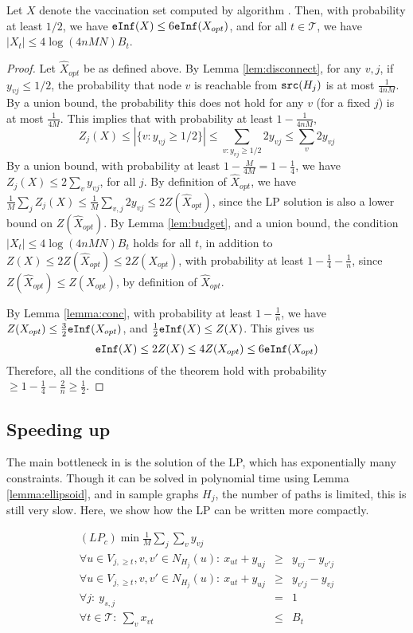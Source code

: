 \begin{theorem}
\label{theorem:algo}
Let $X$ denote the vaccination set computed by algorithm \algo{}.
Then, with probability at least $1/2$, we have
$\texttt{eInf}(X)\leq 6\texttt{eInf}(X_{opt})$, and for all $t\in\mathcal{T}$, we have
$|X_t|\leq 4\log(4nMN)B_t$.
\end{theorem}
\begin{proof}
Let $\hat{X}_{opt}$ be as defined above. 
By Lemma \ref{lem:disconnect}, for any $v, j$, if $y_{vj} \leq 1/2$, the probability that node $v$ is
reachable from $\texttt{src}(H_j)$ is at most $\frac{1}{4nM}$.
By a union bound, the probability this does not hold for any $v$ (for a fixed $j$) is at most $\frac{1}{4M}$.
This implies that with probability at least $1-\frac{1}{4nM}$, 
\[
Z_j(X)\leq |\{v: y_{vj}\geq 1/2\}|\leq \sum_{v: y_{vj}\geq 1/2} 2y_{vj} \leq \sum_v 2y_{vj}
\]
By a union bound, with probability at least $1-\frac{M}{4M}=1-\frac{1}{4}$,
we have $Z_j(X)\leq 2\sum_v y_{vj}$, for all $j$.
By definition of $\hat{X}_{opt}$, we have $\frac{1}{M}\sum_j Z_j(X)\leq \frac{1}{M}\sum_{v,j} 2y_{vj} \leq 2Z(\hat{X}_{opt})$,
since the LP solution is also a lower bound on $Z(\hat{X}_{opt})$.
By Lemma \ref{lem:budget}, and a union bound, the condition $|X_t|\leq 4\log(4nMN)B_t$ holds for all $t$,
in addition to $Z(X)\leq 2Z(\hat{X}_{opt})\leq 2Z(X_{opt})$, with probability at least $1-\frac{1}{4}-\frac{1}{n}$,
since $Z(\hat{X}_{opt})\leq Z(X_{opt})$, by definition of $\hat{X}_{opt}$.

By Lemma \ref{lemma:conc}, with probability at least $1-\frac{1}{n}$,
we have $Z(X_{opt})\leq \frac{3}{2}\texttt{eInf}(X_{opt})$, and
$\frac{1}{2}\texttt{eInf}(X)\leq Z(X)$. This gives us
\[
\texttt{eInf}(X)\leq 2Z(X)\leq 4Z(X_{opt})\leq 6\texttt{eInf}(X_{opt})
\]
Therefore, all the conditions of the theorem hold with probability $\geq 1-\frac{1}{4}-\frac{2}{n}\geq \frac{1}{2}$.
\end{proof}


\subsection{Speeding up \algo{}}

The main bottleneck in \algo{} is the solution of the LP, which has exponentially many constraints.
Though it can be solved in polynomial time using Lemma \ref{lemma:ellipsoid}, and in sample graphs $H_j$,
the number of paths is limited, this is still very slow.
Here, we show how the LP can be written more compactly.

\begin{eqnarray*}
(LP_c) \min \frac{1}{M}\sum_j \sum_v y_{vj} &&\\
\forall u\in V_{j,\geq t}, v, v'\in N_{H_j}(u):\ x_{ut} + y_{uj} &\geq& y_{vj} - y_{v'j}\\
\forall u\in V_{j,\geq t}, v, v'\in N_{H_j}(u):\ x_{ut} + y_{uj} &\geq& y_{v'j} - y_{vj}\\
\forall j:\ y_{s,j} &=& 1\\
\forall t\in\mathcal{T}:\ \sum_v x_{vt} &\leq& B_t\\
\end{eqnarray*}

